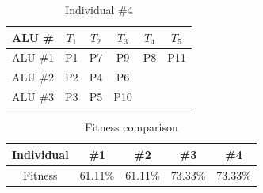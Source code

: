 \documentclass[conference]{IEEEtran}
\begin{document}
\begin{table}[h!]
    \centering
    \begin{tabular}{|c|c|c|c|c|c|}
    \hline
    ALU \#  & $T_1$ & $T_2$ &  $T_3$& $T_4$ & $T_5$ \\
        \hline
       ALU \#1  & P1 & P7 &  P9& P8 & P11\\
       \hline
       ALU \#2  &  P2 & P4 & P6 &  &\\
       \hline
       ALU \#3  & P3 & P5  & P10 &  & \\
       \hline
    \end{tabular}
           \vspace{2pt}
    \caption{Individual \#4}
    \label{tab:Individual4}
\end{table}

\begin{table}[h!]
    \centering
    \begin{tabular}{|c|c|c|c|c|}
    \hline
        Individual & \#1 & \#2 & \#3 & \#4\\
        \hline
        Fitness & 61.11\% & 61.11\% & 73.33\% & 73.33\%\\
        \hline
    \end{tabular}
    \vspace{2pt}
    \caption{Fitness comparison}
    \label{tab:fitness}
\end{table}
\end{document}
